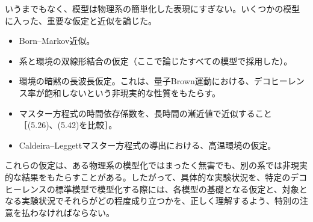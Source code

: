 いうまでもなく、模型は物理系の簡単化した表現にすぎない。いくつかの模型に入った、重要な仮定と近似を論じた。
\begin{itemize}
\item Born--Markov近似。
\item 系と環境の双線形結合の仮定（ここで論じたすべての模型で採用した）。
\item 環境の暗黙の長波長仮定。これは、量子Brown運動における、デコヒーレンス率が飽和しないという非現実的な性質をもたらす。
\item マスター方程式の時間依存係数を、長時間の漸近値で近似すること［(5.26)、(5.42)を比較］。
\item Caldeira--Leggettマスター方程式の導出における、高温環境の仮定。
\end{itemize}
これらの仮定は、ある物理系の模型化ではまったく無害でも、別の系では非現実的な結果をもたらすことがある。したがって、具体的な実験状況を、特定のデコヒーレンスの標準模型で模型化する際には、各模型の基礎となる仮定と、対象となる実験状況でそれらがどの程度成り立つかを、正しく理解するよう、特別の注意を払わなければならない。
